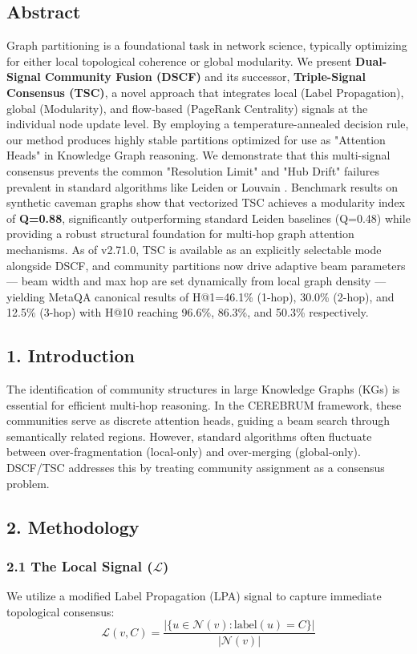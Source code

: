 
\subsection*{Abstract}
Graph partitioning is a foundational task in network science, typically optimizing for either local topological coherence or global modularity. We present \textbf{Dual-Signal Community Fusion (DSCF)} and its successor, \textbf{Triple-Signal Consensus (TSC)}, a novel approach that integrates local (Label Propagation), global (Modularity), and flow-based (PageRank Centrality) signals at the individual node update level. By employing a temperature-annealed decision rule, our method produces highly stable partitions optimized for use as "Attention Heads" in Knowledge Graph reasoning. We demonstrate that this multi-signal consensus prevents the common "Resolution Limit" and "Hub Drift" failures prevalent in standard algorithms like Leiden \cite{traag2019louvain} or Louvain \cite{blondel2008louvain}. Benchmark results on synthetic caveman graphs show that vectorized TSC achieves a modularity index of \textbf{Q=0.88}, significantly outperforming standard Leiden baselines (Q=0.48) while providing a robust structural foundation for multi-hop graph attention mechanisms. As of v2.71.0, TSC is available as an explicitly selectable mode alongside DSCF, and community partitions now drive adaptive beam parameters --- beam width and max hop are set dynamically from local graph density --- yielding MetaQA canonical results of H@1=46.1\% (1-hop), 30.0\% (2-hop), and 12.5\% (3-hop) with H@10 reaching 96.6\%, 86.3\%, and 50.3\% respectively.

\subsection*{1. Introduction}
The identification of community structures in large Knowledge Graphs (KGs) is essential for efficient multi-hop reasoning. In the CEREBRUM framework, these communities serve as discrete attention heads, guiding a beam search through semantically related regions. However, standard algorithms often fluctuate between over-fragmentation (local-only) and over-merging (global-only). DSCF/TSC addresses this by treating community assignment as a consensus problem.

\subsection*{2. Methodology}

\subsubsection*{2.1 The Local Signal ($\mathcal{L}$)}
We utilize a modified Label Propagation (LPA) \cite{raghavan2007lpa} signal to capture immediate topological consensus:
$$\mathcal{L}(v, C) = \frac{|\{u \in \mathcal{N}(v) : \text{label}(u) = C\}|}{|\mathcal{N}(v)|}$$

